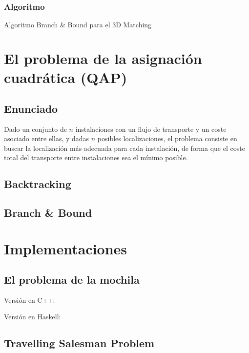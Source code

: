 \documentclass[a4paper, 11pt]{article} %
\begin{document}
  \subsubsection{Algoritmo}
    \begin{algorithm}[H]
    	\begin{algorithmic}[1]
		\REQUIRE 
    	\end{algorithmic}
        \caption{Algoritmo Branch \& Bound para el 3D Matching}
        \label{BBound-3DMatch}
    \end{algorithm}
  

\section{El problema de la asignación cuadrática (QAP)}
  \subsection{Enunciado}
    Dado un conjunto de $n$ instalaciones con un flujo de transporte y un coste asociado entre ellas, y dadas $n$ posibles 
    localizaciones, el problema consiste en buscar la localización más adecuada para cada instalación, de forma que el 
    coste total del transporte entre instalaciones sea el mínimo posible. 

  \subsection{Backtracking}
  \subsection{Branch \& Bound}


\section{Implementaciones}
  \subsection{El problema de la mochila}
        Versión en C++:
        
        \small
  	\texttt{}
        \normalsize
        
        Versión en Haskell:
        
        \small
  	\texttt{}
        \normalsize
        
  \subsection{Travelling Salesman Problem}
        \small
  	\texttt{}
        \normalsize
\end{document}

